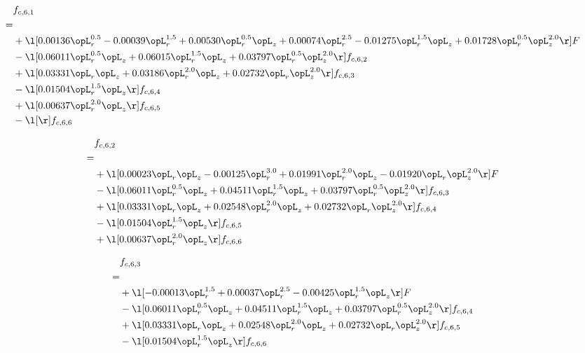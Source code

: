 \begin{alignat}{2} 
\label{eq:f_61_2} 
& f_{c,6,1} \nonumber \\ 
 = \\ 
& + \l[  0.00136 \opL_r^{0.5}   -0.00039 \opL_r^{1.5} +  0.00530 \opL_r^{0.5} \opL_z +  0.00074 \opL_r^{2.5}   -0.01275 \opL_r^{1.5} \opL_z +  0.01728 \opL_r^{0.5} \opL_z^{2.0}  \r] F \nonumber \\ 
& - \l[  0.06011 \opL_r^{0.5} \opL_z +  0.06015 \opL_r^{1.5} \opL_z +  0.03797 \opL_r^{0.5} \opL_z^{2.0}  \r] f_{c,6,2} \nonumber \\ 
& + \l[  0.03331 \opL_r \opL_z +  0.03186 \opL_r^{2.0} \opL_z +  0.02732 \opL_r \opL_z^{2.0}  \r] f_{c,6,3} \nonumber \\ 
& - \l[  0.01504 \opL_r^{1.5} \opL_z  \r] f_{c,6,4} \nonumber \\ 
& + \l[  0.00637 \opL_r^{2.0} \opL_z  \r] f_{c,6,5} \nonumber \\ 
& - \l[  \r] f_{c,6,6} \nonumber \\ 
\end{alignat} 


\begin{alignat}{2} 
\label{eq:f_62_2} 
& f_{c,6,2} \nonumber \\ 
 = \\ 
& + \l[  0.00023 \opL_r \opL_z   -0.00125 \opL_r^{3.0} +  0.01991 \opL_r^{2.0} \opL_z   -0.01920 \opL_r \opL_z^{2.0}  \r] F \nonumber \\ 
& - \l[  0.06011 \opL_r^{0.5} \opL_z +  0.04511 \opL_r^{1.5} \opL_z +  0.03797 \opL_r^{0.5} \opL_z^{2.0}  \r] f_{c,6,3} \nonumber \\ 
& + \l[  0.03331 \opL_r \opL_z +  0.02548 \opL_r^{2.0} \opL_z +  0.02732 \opL_r \opL_z^{2.0}  \r] f_{c,6,4} \nonumber \\ 
& - \l[  0.01504 \opL_r^{1.5} \opL_z  \r] f_{c,6,5} \nonumber \\ 
& + \l[  0.00637 \opL_r^{2.0} \opL_z  \r] f_{c,6,6} \nonumber \\ 
\end{alignat} 


\begin{alignat}{2} 
\label{eq:f_63_2} 
& f_{c,6,3} \nonumber \\ 
 = \\ 
& + \l[  -0.00013 \opL_r^{1.5} +  0.00037 \opL_r^{2.5}   -0.00425 \opL_r^{1.5} \opL_z  \r] F \nonumber \\ 
& - \l[  0.06011 \opL_r^{0.5} \opL_z +  0.04511 \opL_r^{1.5} \opL_z +  0.03797 \opL_r^{0.5} \opL_z^{2.0}  \r] f_{c,6,4} \nonumber \\ 
& + \l[  0.03331 \opL_r \opL_z +  0.02548 \opL_r^{2.0} \opL_z +  0.02732 \opL_r \opL_z^{2.0}  \r] f_{c,6,5} \nonumber \\ 
& - \l[  0.01504 \opL_r^{1.5} \opL_z  \r] f_{c,6,6} \nonumber \\ 
\end{alignat} 


